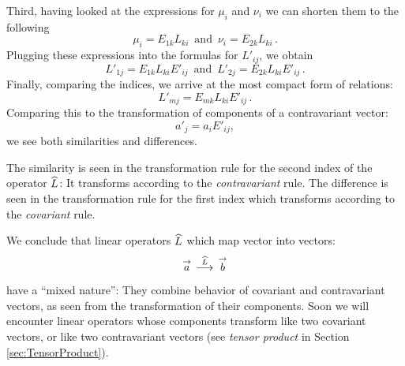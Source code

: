 Third, having looked at the expressions for $\mu_i$  and $\nu_i$ we
can shorten them to the following
\[
\mu_i = E_{1k}L_{ki}\, \textrm{ and }\, \nu_i = E_{2k}L_{ki}\,.
\]
Plugging these expressions into the formulas for $L'_{ij}$, we obtain
\[
L'_{1j} = E_{1k}L_{ki}E'_{ij}\,\textrm{ and }\, L'_{2j} = E_{2k}L_{ki}E'_{ij}\,.
\]
Finally, comparing the indices, we arrive at the most compact form of
relations:
\begin{equation}
  L'_{mj} = E_{mk}L_{ki}E'_{ij}\,.
\end{equation}
Comparing this to the transformation of components of a contravariant
vector:
\[
a'_j = a_i E'_{ij},
\]
we see both similarities and differences.

The similarity is seen in the transformation rule for the second index of
the operator $\widehat{L}$: It transforms according to the \emph{contravariant}
rule. The difference is seen in the transformation rule for the first
index which transforms according to the \emph{covariant} rule.

We conclude that linear operators $\widehat{L}$ which map vector into vectors:
\[
\overset{\rightarrow}{a}\,\overset{\widehat{L}}{\longrightarrow}\,\overset{\rightarrow}{b}
\]
have a ``mixed nature'': They combine behavior of covariant and
contravariant vectors, as seen from the transformation of their
components. Soon we will encounter linear operators whose
components transform like two covariant vectors, or like two
contravariant vectors (see \emph{tensor product} in Section
\ref{sec:TensorProduct}).


